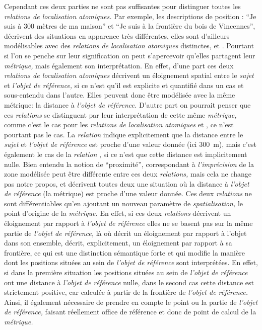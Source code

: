 Cependant ces deux parties ne sont pas suffisantes pour distinguer
toutes les \emph{relations de localisation atomiques.} Par exemple,
les descriptions de position : \enquote{Je suis à 300 mètres de ma
  maison} et \enquote{Je suis à la frontière du bois de Vincennes},
décrivent des situations en apparence très différentes, elles sont
d'ailleurs modélisables avec des \emph{relations de localisation
  atomiques} distinctes,  et
. Pourtant si l'on se penche sur leur
signification on peut s’apercevoir qu'elles partagent leur
\emph{métrique,} mais également son interprétation. En effet, d'une
part ces deux \emph{relations de localisation atomiques} décrivent un
éloignement spatial entre le \emph{sujet} et \emph{l'objet de
  référence,} si ce n'est qu'il est explicite et quantifié dans un cas
et sous-entendu dans l'autre. Elles peuvent donc être modélisée avec
la même métrique: la distance à \emph{l'objet de référence.} D'autre
part on pourrait penser que ces \emph{relations} se distinguent par
leur interprétation de cette même \emph{métrique,} comme c'est le cas
pour les \emph{relations de localisation atomiques}
 et , ce n'est pourtant
pas le cas. La \emph{relation} 
indique explicitement que la distance entre le \emph{sujet} et
\emph{l'objet de référence} est proche d'une valeur donnée (ici
\SI{300}{\meter}), mais c'est également le cas de la \emph{relation}
, si ce n'est que cette distance est
implicitement nulle. Bien entendu la notion de \enquote{proximité},
correspondant à \emph{l'imprécision} de la zone modélisée peut être
différente entre ces deux \emph{relations,} mais cela ne change pas
notre propos,  et
 décrivent toutes deux une situation
où la distance à \emph{l'objet de référence} (\ie la métrique) est
proche d'une valeur donnée. Ces deux \emph{relations} ne sont
différentiables qu'en ajoutant un nouveau paramètre de
\emph{spatialisation,} le point d'origine de la \emph{métrique.} En
effet, si ces deux \emph{relations} décrivent un éloignement par
rapport à \emph{l'objet de référence} elles ne se basent pas sur la
même partie de \emph{l'objet de référence,} là où
 décrit un éloignement par rapport à
l'objet dans son ensemble,  décrit,
explicitement, un éloignement par rapport à sa frontière, ce qui est
une distinction sémantique forte et qui modifie la manière dont les
positions situées au sein de \emph{l'objet de référence} sont
interprétées. En effet, si dans la première situation les positions
situées au sein de \emph{l'objet de référence} ont une distance à
\emph{l'objet de référence} nulle, dans le second cas cette distance
est strictement positive, car calculée à partir de la frontière de
\emph{l'objet de référence.} Ainsi, il également nécessaire de prendre
en compte le point ou la partie de \emph{l'objet de référence,}
faisant réellement office de référence et donc de point de calcul de
la \emph{métrique.}

